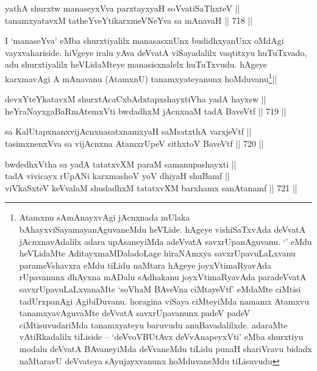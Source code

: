 \begin{shl}
yathA shurxtw manaseyxVva parxtayxyaH soV\s vatiSaThxteV ||  \\
tanamxyatavxM tatheYveYtikarxmeVNeYva sa mAnavaH ||  718 ||  
\end{shl}

\begin{artha} 
I `manaseYva' eMba shurxtiyalilx manasasxnUnx budidhxyanUnx oMdAgi 
vayxvahariside. hiVgeye iralu yAva deVvatA viSayadalilx vaqtitxyu 
huTuTxvado, adu shurxtiyalilx heVLidaMteye manasisxnalelx huTuTxvudu. 
hAgeye karxmavAgi A mAnavanu (AtamxnU) tanamxyateyanunx 
hoMduvanu\footnote[1]{Atamxnu sAmAnayxvAgi jAcnxnada mUlaka 
bAhayxviSayamayanAguvaneMdu heVLide. hAgeye vishiSaTxvAda deVvatA 
jAcnxnavAdalilx adara upAsaneyiMda adeVvatA savxrUpanAguvanu. `\stext' 
eMdu heVLidaMte AditayxmaMDaladoLage hiraNAmxya savxrUpavuLaLxvanu 
parameVshavxra eMdu tiLidu naMtara hAgeye joyxVtimaRyavAda rUpavanunx 
dhAyxna mADalu sAdhakanu joyxVtimaRyavAda paradeVvatA 
savxrUpavuLaLxvanaMte `soVhaM BAveVna ciMtayeVtf' eMdaMte ciMtisi 
tadUrxpanAgi AgibiDuvanu. horagina viSaya ciMteyiMda namamx Atamxvu 
tanamxyavAguvaMte deVvatA savxrUpavanunx padeV padeV ciMtisuvudariMda 
tanamxyateyu baruvudu anuBavadalilxde. adaraMte vAtiRkadalilx tiLiside 
-- `deVvoVBUtAvx deVvAnapeyxVti' eMba shurxtiyu modalu deVvatA 
BAvaneyiMda deVvaneMdu tiLidu punaH shariVravu bidadx naMtaravU 
deVvateya sAyujayxvanunx hoMduvaneMdu tiLisuvudu}||
\end{artha}


\begin{shl}
devxYteYkatavxM shurxtAcaCxbAdxtapxshayxtiVha yadA hayxsw || \\
heYraNayxgaBaRmAtemxVti bwdadhxM jAcnxnaM tadA BaveVtf ||  719 ||  
\end{shl}
				
\begin{shl}
sa KalUtapxnanxvijAcnxnasatxnamxyaH saMsatxthA varxjeVtf || \\
tasimxnenxVva sa vijAcnxna AtamxrUpeV sithxtoV BaveVtf ||  720 ||  
\end{shl}
				
\begin{shl}
bwdedhxV\s tha sa yadA tatatxvXM paraM samanupashayxti || \\
tadA vivicayx rUpANi karxmashoV yoV dhiyaH shuBamf || \\
viVkaSxteV keVvalaM shudadhxM tatatxvXM barxhamx sanAtanamf ||  721 ||  
\end{shl}

